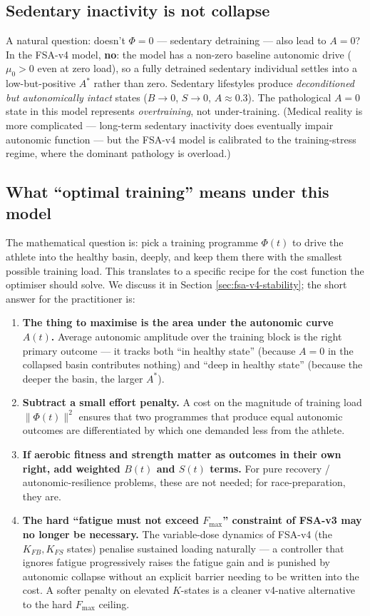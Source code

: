 \subsection{Sedentary inactivity is not collapse}

A natural question: doesn't $\Phi = 0$ — sedentary detraining — also lead to $A = 0$? In the FSA-v4 model, \textbf{no}: the model has a non-zero baseline autonomic drive ($\mu_0 > 0$ even at zero load), so a fully detrained sedentary individual settles into a low-but-positive $A^*$ rather than zero. Sedentary lifestyles produce \emph{deconditioned but autonomically intact} states ($B \to 0$, $S \to 0$, $A \approx 0.3$). The pathological $A = 0$ state in this model represents \emph{overtraining}, not under-training. (Medical reality is more complicated — long-term sedentary inactivity does eventually impair autonomic function — but the FSA-v4 model is calibrated to the training-stress regime, where the dominant pathology is overload.)

\subsection{What ``optimal training'' means under this model}

The mathematical question is: pick a training programme $\Phi(t)$ to drive the athlete into the healthy basin, deeply, and keep them there with the smallest possible training load. This translates to a specific recipe for the cost function the optimiser should solve. We discuss it in Section \ref{sec:fsa-v4-stability}; the short answer for the practitioner is:

\begin{enumerate}
  \item \textbf{The thing to maximise is the area under the autonomic curve $A(t)$.} Average autonomic amplitude over the training block is the right primary outcome — it tracks both ``in healthy state'' (because $A=0$ in the collapsed basin contributes nothing) and ``deep in healthy state'' (because the deeper the basin, the larger $A^*$).
  \item \textbf{Subtract a small effort penalty.} A cost on the magnitude of training load $\|\Phi(t)\|^2$ ensures that two programmes that produce equal autonomic outcomes are differentiated by which one demanded less from the athlete.
  \item \textbf{If aerobic fitness and strength matter as outcomes in their own right, add weighted $B(t)$ and $S(t)$ terms.} For pure recovery / autonomic-resilience problems, these are not needed; for race-preparation, they are.
  \item \textbf{The hard ``fatigue must not exceed $F_{\max}$'' constraint of FSA-v3 may no longer be necessary.} The variable-dose dynamics of FSA-v4 (the $K_{FB}, K_{FS}$ states) penalise sustained loading naturally — a controller that ignores fatigue progressively raises the fatigue gain and is punished by autonomic collapse without an explicit barrier needing to be written into the cost. A softer penalty on elevated $K$-states is a cleaner v4-native alternative to the hard $F_{\max}$ ceiling.
\end{enumerate}

